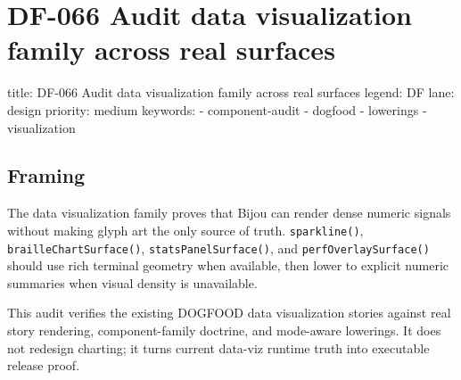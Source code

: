 \chapter{DF-066 Audit data visualization family across real surfaces}\label{record-107}

\smallskip

\begin{RecordMeta}
title: DF-066 Audit data visualization family across real surfaces
legend: DF
lane: design
priority: medium
keywords:
  - component-audit
  - dogfood
  - lowerings
  - visualization

\end{RecordMeta}

\section{Framing}\label{record-107-framing}

The data visualization family proves that Bijou can render dense numeric signals without making glyph art the only source of truth. \texttt{s\allowbreak{}p\allowbreak{}a\allowbreak{}r\allowbreak{}k\allowbreak{}l\allowbreak{}i\allowbreak{}n\allowbreak{}e\allowbreak{}(\allowbreak{})}, \texttt{b\allowbreak{}r\allowbreak{}a\allowbreak{}i\allowbreak{}l\allowbreak{}l\allowbreak{}e\allowbreak{}C\allowbreak{}h\allowbreak{}a\allowbreak{}r\allowbreak{}t\allowbreak{}S\allowbreak{}u\allowbreak{}r\allowbreak{}f\allowbreak{}a\allowbreak{}c\allowbreak{}e\allowbreak{}(\allowbreak{})}, \texttt{s\allowbreak{}t\allowbreak{}a\allowbreak{}t\allowbreak{}s\allowbreak{}P\allowbreak{}a\allowbreak{}n\allowbreak{}e\allowbreak{}l\allowbreak{}S\allowbreak{}u\allowbreak{}r\allowbreak{}f\allowbreak{}a\allowbreak{}c\allowbreak{}e\allowbreak{}(\allowbreak{})}, and \texttt{p\allowbreak{}e\allowbreak{}r\allowbreak{}f\allowbreak{}O\allowbreak{}v\allowbreak{}e\allowbreak{}r\allowbreak{}l\allowbreak{}a\allowbreak{}y\allowbreak{}S\allowbreak{}u\allowbreak{}r\allowbreak{}f\allowbreak{}a\allowbreak{}c\allowbreak{}e\allowbreak{}(\allowbreak{})} should use rich terminal geometry when available, then lower to explicit numeric summaries when visual density is unavailable.

This audit verifies the existing DOGFOOD data visualization stories against real story rendering, component-family doctrine, and mode-aware lowerings. It does not redesign charting; it turns current data-viz runtime truth into executable release proof.

